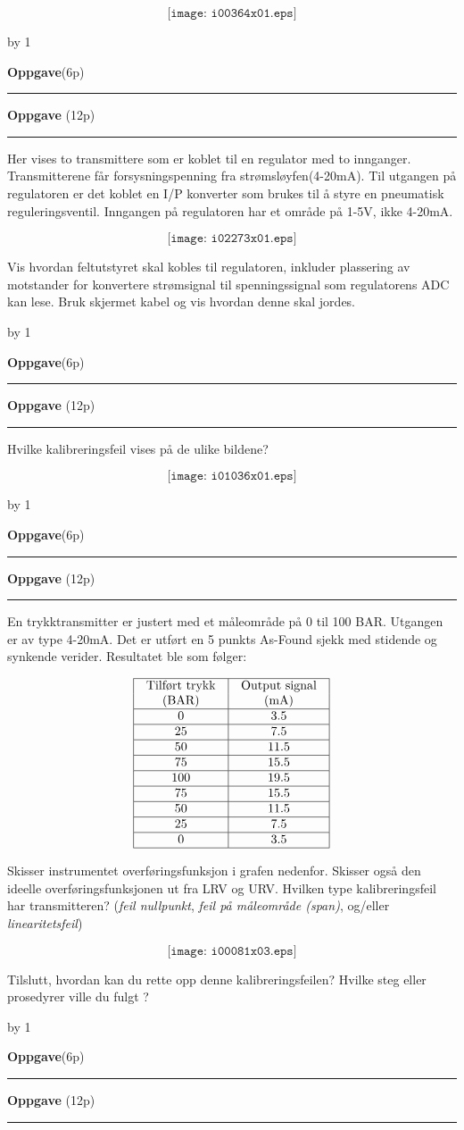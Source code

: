 \documentclass[12pt,a4paper]{article}
\def\oppgave{
            \advance\questnum by 1
	    \ifthenelse{\questnum>0\AND \questnum<9}
	    {
                \vskip 1cm
		\textbf{Oppgave}\hskip 5pt\the\questnum \hfill \hfill(6p)
		\vskip 3pt
		\hrule
	\vskip 0.5cm}
	{
                \vskip 1cm
		\textbf{Oppgave}\hskip 5pt \the\questnum \hfill \hfill(12p)
		\vskip 3pt \hrule \vskip 0.5cm }

		}
\begin{document}
$$\texttt{[image: i00364x01.eps]}$$

\newpage
\oppgave{}
Her vises to transmittere som er koblet til en regulator med to innganger. Transmitterene får forsysningspenning fra strømsløyfen(4-20mA). Til utgangen på regulatoren er det koblet en I/P konverter som brukes til å styre en pneumatisk reguleringsventil. Inngangen på regulatoren har et område på 1-5V, ikke 4-20mA. 

$$\texttt{[image: i02273x01.eps]}$$

Vis hvordan feltutstyret skal kobles til regulatoren, inkluder plassering av motstander for konvertere strømsignal til spenningssignal som regulatorens ADC kan lese. Bruk skjermet kabel og vis hvordan denne skal jordes. 

\newpage
\oppgave{}
Hvilke kalibreringsfeil vises på de ulike bildene?

$$\texttt{[image: i01036x01.eps]}$$
\newpage
\oppgave{}

En trykktransmitter er justert med et måleområde på 0 til 100 BAR. Utgangen er av type 4-20mA. 
Det er utført en 5 punkts As-Found sjekk med stidende og synkende verider. Resultatet ble som følger:


$$\vbox{\offinterlineskip
\halign{\strut
\vrule \quad\hfil # \ \hfil & 
\vrule \quad\hfil # \ \hfil \vrule \cr
\noalign{\hrule}
%
Tilført trykk & Output signal \cr
%
(BAR) & (mA) \cr
%
\noalign{\hrule}
%
0 & 3.5 \cr
%
\noalign{\hrule}
%
25 & 7.5 \cr
%
\noalign{\hrule}
%
50 & 11.5 \cr
%
\noalign{\hrule}
%
75 & 15.5 \cr
%
\noalign{\hrule}
%
100 & 19.5 \cr
%
\noalign{\hrule}
%
75 & 15.5 \cr
%
\noalign{\hrule}
%
50 & 11.5 \cr
%
\noalign{\hrule}
%
25 & 7.5 \cr
%
\noalign{\hrule}
%
0 & 3.5 \cr
%
\noalign{\hrule}
} %
}$$ %

Skisser instrumentet overføringsfunksjon i grafen nedenfor. Skisser også den ideelle overføringsfunksjonen ut fra LRV og URV. Hvilken type kalibreringsfeil har transmitteren?  ({\it feil nullpunkt}, {\it feil på måleområde (span)}, og/eller {\it linearitetsfeil})

$$\texttt{[image: i00081x03.eps]}$$

Tilslutt, hvordan kan du rette opp denne kalibreringsfeilen? Hvilke steg eller prosedyrer ville du fulgt ?
\oppgave{}
\end{document}
